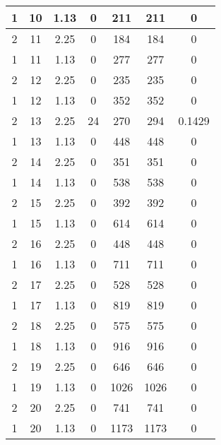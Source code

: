 \documentclass[letterpaper, 12pt]{article}
\begin{document}
\begin{longtable}{|c|c|c|c|c|c|c|}
\hline
1 & 10 & 1.13 & 0 & 211 & 211 & 0 \\
\hline
2 & 11 & 2.25 & 0 & 184 & 184 & 0 \\
\hline
1 & 11 & 1.13 & 0 & 277 & 277 & 0 \\
\hline
2 & 12 & 2.25 & 0 & 235 & 235 & 0 \\
\hline
1 & 12 & 1.13 & 0 & 352 & 352 & 0 \\
\hline
2 & 13 & 2.25 & 24 & 270 & 294 & 0.1429 \\
\hline
1 & 13 & 1.13 & 0 & 448 & 448 & 0 \\
\hline
2 & 14 & 2.25 & 0 & 351 & 351 & 0 \\
\hline
1 & 14 & 1.13 & 0 & 538 & 538 & 0 \\
\hline
2 & 15 & 2.25 & 0 & 392 & 392 & 0 \\
\hline
1 & 15 & 1.13 & 0 & 614 & 614 & 0 \\
\hline
2 & 16 & 2.25 & 0 & 448 & 448 & 0 \\
\hline
1 & 16 & 1.13 & 0 & 711 & 711 & 0 \\
\hline
2 & 17 & 2.25 & 0 & 528 & 528 & 0 \\
\hline
1 & 17 & 1.13 & 0 & 819 & 819 & 0 \\
\hline
2 & 18 & 2.25 & 0 & 575 & 575 & 0 \\
\hline
1 & 18 & 1.13 & 0 & 916 & 916 & 0 \\
\hline
2 & 19 & 2.25 & 0 & 646 & 646 & 0 \\
\hline
1 & 19 & 1.13 & 0 & 1026 & 1026 & 0 \\
\hline
2 & 20 & 2.25 & 0 & 741 & 741 & 0 \\
\hline
1 & 20 & 1.13 & 0 & 1173 & 1173 & 0 \\
\hline
\end{longtable}
\end{document}
